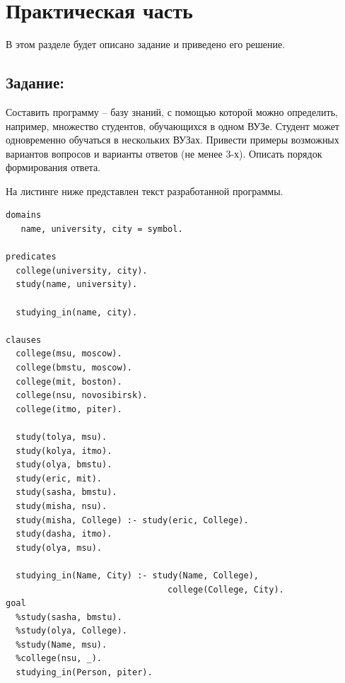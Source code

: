 \chapter{Практическая часть}

В этом разделе будет описано задание и приведено его решение.

\section{Задание:}
Составить программу -- базу знаний, с помощью которой можно определить, например, множество студентов, обучающихся в одном ВУЗе. Студент может одновременно обучаться в нескольких ВУЗах. Привести примеры возможных вариантов вопросов и варианты ответов (не менее 3-х). Описать порядок формирования ответа.

На листинге ниже представлен текст разработанной программы.

\lstset{language=python}
\begin{lstlisting}[caption=Текст программы]
domains
   name, university, city = symbol.

predicates
  college(university, city).
  study(name, university).

  studying_in(name, city).

clauses
  college(msu, moscow).
  college(bmstu, moscow).
  college(mit, boston).
  college(nsu, novosibirsk).
  college(itmo, piter).

  study(tolya, msu).
  study(kolya, itmo).
  study(olya, bmstu).
  study(eric, mit).
  study(sasha, bmstu).
  study(misha, nsu).
  study(misha, College) :- study(eric, College).
  study(dasha, itmo).
  study(olya, msu).

  studying_in(Name, City) :- study(Name, College),
                                college(College, City).
goal
  %study(sasha, bmstu).
  %study(olya, College).
  %study(Name, msu).
  %college(nsu, _).
  studying_in(Person, piter).
\end{lstlisting}


